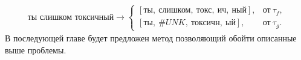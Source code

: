\begin{gather*}
    \textit{ты слишком токсичный} \longrightarrow 
    \begin{cases} 
        [\textit{ты},\ \textit{слишком},\ \textit{токс},\ \textit{ич},\ \textit{ный}], &\text{от}\ \tau_{f}, \\
        [\textit{ты},\ \textit{\#UNK},\ \textit{токсичн},\ \textit{ый}], &\text{от}\ \tau_{g}.
    \end{cases}
\end{gather*}
В последующей главе  будет предложен метод позволяющий обойти описанные выше проблемы. 
